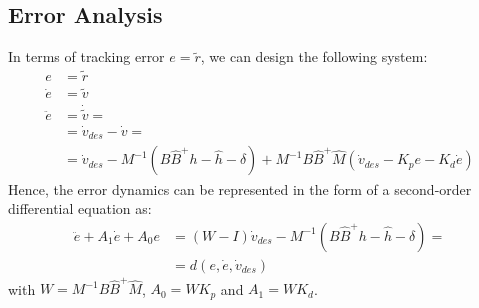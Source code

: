     \subsection{Error Analysis}
    In terms of tracking error $e = \tilde{r}$, we can design the following system:
    \begin{equation}
        \begin{aligned}
        e &= \tilde{r} \\
        \dot{e} &= \tilde{v} \\
        \ddot{e} &= \dot{\tilde{v}} =\\
        &= \dot{v}_{des} - \dot{v} =\\
        &= \dot{v}_{des} - M^{-1}(B\hat{B}^{+}h - \hat{h} - \delta) + M^{-1}B\hat{B}^{+}\hat{M}(\dot{v}_{des} - K_pe - K_d \dot{e})
        \end{aligned}
        \end{equation}
    Hence, the error dynamics can be represented in the form of a second-order differential equation as:
    \begin{equation}
    \begin{aligned}
        \ddot e + A_1 \dot e + A_0 e  &= (W-I)\dot{v}_{des}
        - M^{-1}(B\hat{B}^{+}h - \hat h - \delta) =\\
        &=d(e, \dot{e}, \dot{v}_{des})
    \end{aligned}
    \end{equation}
    with $W = M^{-1}B\hat{B}^{+}\hat{M}$, $A_0 = WK_p$ and $A_1 = WK_d$.

